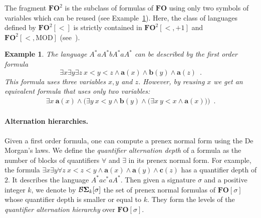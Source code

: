 \documentclass[submission,hidelink]{dmtcs-episciences}
\newtheorem{example}{Example}
\newcommand{\FO}{\mathbf{FO}}
\newcommand{\BS}{\mathbf{{\cal B}\Sigma}}
\newcommand{\MOD}{\mathrm{MOD}}
\begin{document}
	The fragment $\FO^2$ is the subclass of formulas of $\FO$ using only two symbols of variables which can be reused (see Example~\ref{FO2:ex}).
	Here, the class of languages defined by $\FO^2[<]$ is strictly contained in $\FO^2[<,+1]$ and $\FO^2[<,\MOD]$ (see~\cite{TW98,DP13}).
	\begin{example}\label{FO2:ex}
	The language $A^*aA^*bA^*aA^*$ can be described by the first order formula
	$$\exists x \exists y \exists z\ x <y < z \land \mathbf{a}(x)\land \mathbf{b}(y)\land \mathbf{a}(z)\enspace.$$
	This formula uses three variables $x,y$ and $z$. However, by reusing $x$ we get an equivalent formula that uses only two variables:
	\begin{align}
	\exists x\ \mathbf{a}(x) \land \Big(\exists y\  x < y  \land \mathbf{b}(y)\land \big(\exists x \ y<x\land \mathbf{a}(x)\big)\Big)\enspace.\tag{a}\label{eq1}
	\end{align}
	\end{example}



\paragraph{Alternation hierarchies.}
	Given a first order formula, one can compute a prenex normal form using the De Morgan's laws.
	We define the \emph{quantifier alternation depth} of a formula as the number of blocks  of quantifiers $\forall$ and $\exists$ in its prenex normal form.
	For example, the formula $\exists x\exists y \forall z\ x\!<\!z\!<\!y \land \mathbf{a}(x)\land \mathbf{a}(y)\land \mathbf{c}(z)$ has a quantifier depth of $2$.
	It describes the language $A^*ac^*aA^*$.
	Then given a signature $\sigma$ and a positive integer $k$, we denote by $\BS_k[\sigma]$ the set of prenex normal formulas of $\FO[\sigma]$ whose quantifier depth is smaller or equal to $k$.
 They form the levels of the \emph{quantifier alternation hierarchy} over $\FO[\sigma]$.
\end{document}
